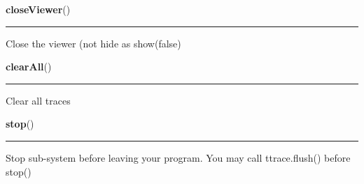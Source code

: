 \hspace{.8\funcindent}\begin{boxedminipage}{\funcwidth}

    \raggedright \textbf{closeViewer}()

    \vspace{-1.5ex}

    \rule{\textwidth}{0.5\fboxrule}
\setlength{\parskip}{2ex}
    Close the viewer (not hide as show(false)

\setlength{\parskip}{1ex}
    \end{boxedminipage}

    \label{tracetool:TTrace:clearAll}

    \vspace{0.5ex}

\hspace{.8\funcindent}\begin{boxedminipage}{\funcwidth}

    \raggedright \textbf{clearAll}()

    \vspace{-1.5ex}

    \rule{\textwidth}{0.5\fboxrule}
\setlength{\parskip}{2ex}
    Clear all traces

\setlength{\parskip}{1ex}
    \end{boxedminipage}

    \label{tracetool:TTrace:stop}

    \vspace{0.5ex}

\hspace{.8\funcindent}\begin{boxedminipage}{\funcwidth}

    \raggedright \textbf{stop}()

    \vspace{-1.5ex}

    \rule{\textwidth}{0.5\fboxrule}
\setlength{\parskip}{2ex}
    Stop sub-system before leaving your program. You may call 
    ttrace.flush() before stop()

\setlength{\parskip}{1ex}
    \end{boxedminipage}

    \label{tracetool:TTrace:flush}

